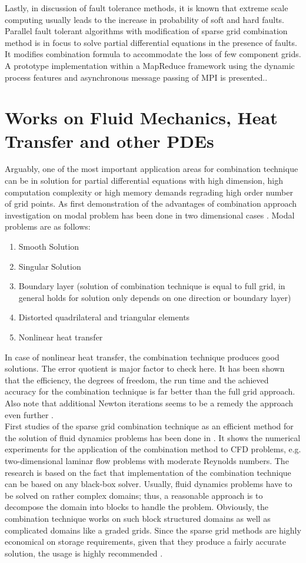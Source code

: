 Lastly, in discussion of fault tolerance methods, it is known that extreme scale computing usually leads to the increase in probability of soft and hard faults. Parallel fault tolerant algorithms with modification of sparse grid combination method is in focus to solve partial differential equations in the presence of faults. It modifies combination formula to accommodate the loss of few component grids. A prototype implementation within a MapReduce framework using the dynamic process features and asynchronous message passing of MPI is presented.\cite{Larson2013}. 
\section{Works on Fluid Mechanics, Heat Transfer and other PDEs} 
Arguably, one of the most important application areas for combination technique can be in solution for partial differential equations with high dimension, high computation complexity or high memory demands regrading high order number of grid points. As first demonstration of the advantages of combination approach investigation on modal problem has been done in two dimensional cases \cite{Griebel1992b}. Modal problems are as follows:
\begin{enumerate}
\item Smooth Solution
\item Singular Solution
\item Boundary layer (solution of combination technique is equal to full grid, in general holds for solution only depends on one direction or boundary layer)
\item Distorted quadrilateral and triangular elements
\item Nonlinear heat transfer
\end{enumerate}
In case of nonlinear heat transfer, the combination technique produces good solutions. The error quotient is major factor to check here. It has been shown that the efficiency, the degrees of freedom, the run time and the achieved accuracy for the combination technique is far better than the full grid approach. Also note that additional Newton iterations seems to be a remedy the approach even further \cite{Griebel1992b}.\\

First studies of the sparse grid combination technique as an efficient method for the solution of fluid dynamics problems has been done in \cite{Griebel1995}. It shows the numerical experiments for the application of the combination method to CFD problems, e.g. two-dimensional laminar flow problems with moderate Reynolds numbers. The research is based on the fact that implementation of the combination technique can be based on any black-box solver. Usually, fluid dynamics problems have to be solved on rather complex domains; thus, a reasonable approach is to decompose the domain into blocks to handle the problem. Obviously, the combination technique works on such block structured domains as well as complicated domains like a graded grids. Since the sparse grid methods are highly economical on storage requirements, given that they produce a fairly accurate solution, the usage is highly recommended \cite{Griebel1995}.\\

